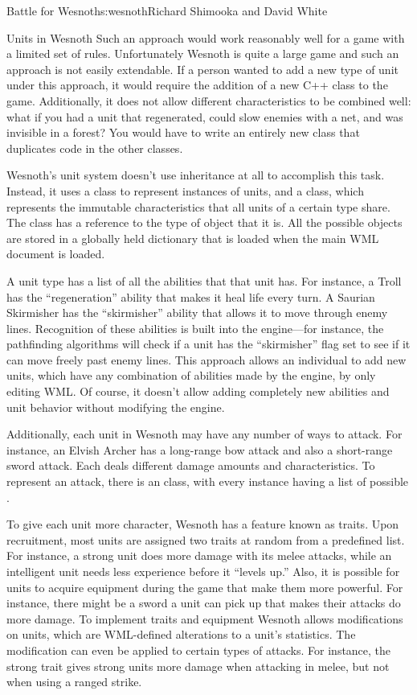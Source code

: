 \begin{aosachapter}{Battle for Wesnoth}{s:wesnoth}{Richard Shimooka and David White}
\begin{aosasect1}{Units in Wesnoth}
Such an approach would work reasonably well for a game with a limited
set of rules. Unfortunately Wesnoth is quite a large game and such an
approach is not easily extendable. If a person wanted to add a new
type of unit under this approach, it would require the addition of a
new C++ class to the game. Additionally, it does not allow different
characteristics to be combined well: what if you had a unit that
regenerated, could slow enemies with a net, and was invisible in a
forest? You would have to write an entirely new class that duplicates
code in the other classes.

Wesnoth's unit system doesn't use inheritance at all to accomplish
this task. Instead, it uses a  class to represent instances
of units, and a  class, which represents the
immutable characteristics that all units of a certain type share. The
 class has a reference to the type of object that it is.
All the possible  objects are stored in a globally
held dictionary that is loaded when the main WML document is loaded.

A unit type has a list of all the abilities that that unit has. For
instance, a Troll has the ``regeneration'' ability that makes it heal
life every turn. A Saurian Skirmisher has the ``skirmisher'' ability
that allows it to move through enemy lines. Recognition of these
abilities is built into the engine---for instance, the pathfinding
algorithms will check if a unit has the ``skirmisher'' flag set to see
if it can move freely past enemy lines. This approach allows an
individual to add new units, which have any combination of abilities
made by the engine, by only editing WML\@. Of course, it doesn't allow
adding completely new abilities and unit behavior without modifying
the engine.

Additionally, each unit in Wesnoth may have any number of ways to
attack.  For instance, an Elvish Archer has a long-range bow attack
and also a short-range sword attack. Each deals different damage
amounts and characteristics. To represent an attack, there is an
 class, with every  instance
having a list of possible .

To give each unit more character, Wesnoth has a feature known as
traits. Upon recruitment, most units are assigned two traits at random
from a predefined list. For instance, a strong unit does more damage
with its melee attacks, while an intelligent unit needs less
experience before it ``levels up.'' Also, it is possible for units to
acquire equipment during the game that make them more powerful. For
instance, there might be a sword a unit can pick up that makes their
attacks do more damage. To implement traits and equipment Wesnoth
allows modifications on units, which are WML-defined alterations to a
unit's statistics. The modification can even be applied to certain
types of attacks. For instance, the strong trait gives strong units
more damage when attacking in melee, but not when using a ranged
strike.


\end{aosasect1}
\end{aosachapter}

